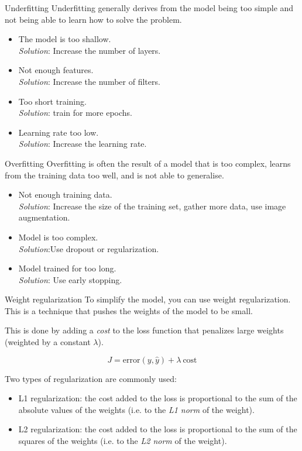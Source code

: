 \documentclass[9pt, aspectratio=169]{beamer}
\begin{document}
\begin{frame}
    {Underfitting}
    Underfitting generally derives from the model being too simple and not being able to learn how to solve the problem.

    \begin{itemize}[<+->]
        \item The model is too shallow.\\\textit{Solution}: Increase the number of layers.
        \item Not enough features.\\\textit{Solution}: Increase the number of filters.
        \item Too short training.\\\textit{Solution}: train for more epochs.
        \item Learning rate too low.\\\textit{Solution}: Increase the learning rate.
    \end{itemize}
\end{frame}

\begin{frame}
    {Overfitting}
    Overfitting is often the result of a model that is too complex, learns from the training data too well, and is not able to generalise.

    \begin{itemize}
        \item Not enough training data.\\\textit{Solution}: Increase the size of the training set, gather more data, use image augmentation.
        \item Model is too complex.\\\textit{Solution}:Use dropout or regularization.
        \item Model trained for too long.\\\textit{Solution}: Use early stopping.
    \end{itemize}
\end{frame}

\begin{frame}
    {Weight regularization}
    To simplify the model, you can use weight regularization.
    This is a technique that pushes the weights of the model to be small.

    This is done by adding a \textit{cost} to the loss function that penalizes large weights (weighted by a constant $\lambda$).

    \Large
    $$J = \text{error}(y, \hat y) + \lambda ~ \text{cost}$$

    \normalsize
    Two types of regularization are commonly used:

    \begin{itemize}
        \item L1 regularization: the cost added to the loss is proportional to the sum of the absolute values of the weights (i.e. to the \textit{L1 norm} of the weight).
        \item L2 regularization: the cost added to the loss is proportional to the sum of the squares of the weights (i.e. to the \textit{L2 norm} of the weight).
    \end{itemize}
\end{frame}
\end{document}
